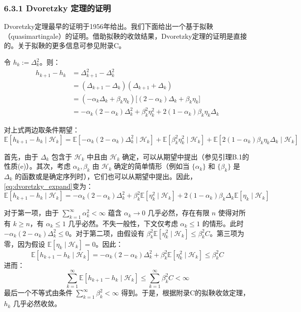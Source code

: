 \documentclass[UTF8]{article}
\begin{document}
\subsubsection*{6.3.1 Dvoretzky 定理的证明}

Dvoretzky定理最早的证明于1956年给出。我们下面给出一个基于拟鞅（quasimartingale）的证明。借助拟鞅的收敛结果，Dvoretzky定理的证明是直接的。关于拟鞅的更多信息可参见附录C。

\begin{proofbox}
    令 $h_k := \Delta_k^2$。则：
    \[
    \begin{aligned}
    h_{k+1} - h_k &= \Delta_{k+1}^2 - \Delta_k^2 \\
    &= (\Delta_{k+1} - \Delta_k)(\Delta_{k+1} + \Delta_k) \\
    &= (-\alpha_k \Delta_k + \beta_k \eta_k)\big[(2 - \alpha_k)\Delta_k + \beta_k \eta_k\big] \\
    &= -\alpha_k(2 - \alpha_k)\Delta_k^2 + \beta_k^2 \eta_k^2 + 2(1 - \alpha_k)\beta_k \eta_k \Delta_k
    \end{aligned}
    \]

    对上式两边取条件期望：
    \begin{equation}
    \label{eq:dvoretzky_expand}
    \mathbb{E}[h_{k+1} - h_k \mid \mathcal{H}_k] = \mathbb{E}[-\alpha_k(2 - \alpha_k)\Delta_k^2 \mid \mathcal{H}_k] + \mathbb{E}[\beta_k^2 \eta_k^2 \mid \mathcal{H}_k] + \mathbb{E}[2(1 - \alpha_k)\beta_k \eta_k \Delta_k \mid \mathcal{H}_k]
    \end{equation}

    首先，由于 $\Delta_k$ 包含于 $\mathcal{H}_k$ 中且由 $\mathcal{H}_k$ 确定，可以从期望中提出（参见引理B.1的性质(e)）。其次，考虑 $\alpha_k, \beta_k$ 由 $\mathcal{H}_k$ 确定的简单情形（例如当 $\{\alpha_k\}$ 和 $\{\beta_k\}$ 是 $\Delta_k$ 的函数或是确定序列时），它们也可以从期望中提出。因此，\eqref{eq:dvoretzky_expand}变为：
    \[
    \mathbb{E}[h_{k+1} - h_k \mid \mathcal{H}_k] = -\alpha_k(2 - \alpha_k)\Delta_k^2 + \beta_k^2 \mathbb{E}[\eta_k^2 \mid \mathcal{H}_k] + 2(1 - \alpha_k)\beta_k \Delta_k \mathbb{E}[\eta_k \mid \mathcal{H}_k]
    \]

    对于第一项，由于 $\sum_{k=1}^{\infty} \alpha_k^2 < \infty$ 蕴含 $\alpha_k \to 0$ 几乎必然，存在有限 $n$ 使得对所有 $k \geq n$，有 $\alpha_k \leq 1$ 几乎必然。不失一般性，下文仅考虑 $\alpha_k \leq 1$ 的情形。此时 $-\alpha_k(2 - \alpha_k)\Delta_k^2 \leq 0$。对于第二项，由假设有 $\beta_k^2 \mathbb{E}[\eta_k^2 \mid \mathcal{H}_k] \leq \beta_k^2 C$。第三项为零，因为假设 $\mathbb{E}[\eta_k \mid \mathcal{H}_k] = 0$。因此：
    \[
    \mathbb{E}[h_{k+1} - h_k \mid \mathcal{H}_k] = -\alpha_k(2 - \alpha_k)\Delta_k^2 + \beta_k^2 \mathbb{E}[\eta_k^2 \mid \mathcal{H}_k] \leq \beta_k^2 C
    \]
    进而：
    \[
    \sum_{k=1}^{\infty} \mathbb{E}[h_{k+1} - h_k \mid \mathcal{H}_k] \leq \sum_{k=1}^{\infty} \beta_k^2 C < \infty
    \]
    最后一个不等式由条件 $\sum_{k=1}^{\infty} \beta_k^2 < \infty$ 得到。于是，根据附录C的拟鞅收敛定理，$h_k$ 几乎必然收敛。


\end{proofbox}
\end{document}
